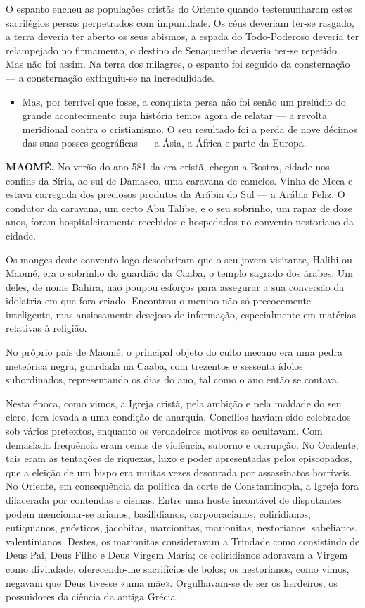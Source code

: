 \documentclass[11pt,a5paper,twoside,openany]{book}
\begin{document}
O espanto encheu as populações cristãs do Oriente quando testemunharam estes sacrilégios persas perpetrados com impunidade. Os céus deveriam ter-se rasgado, a terra deveria ter aberto os seus abismos, a espada do Todo-Poderoso deveria ter relampejado no firmamento, o destino de Senaqueribe deveria ter-se repetido. Mas não foi assim. Na terra dos milagres, o espanto foi seguido da consternação — a consternação extinguiu-se na incredulidade.

\begin{itemize}
\item Mas, por terrível que fosse, a conquista persa não foi senão um prelúdio do grande acontecimento cuja história temos agora de relatar — a revolta meridional contra o cristianismo. O seu resultado foi a perda de nove décimos das suas posses geográficas — a Ásia, a África e parte da Europa.
\end{itemize}
\textbf{MAOMÉ.} No verão do ano 581 da era cristã, chegou a Bostra, cidade nos confins da Síria, ao sul de Damasco, uma caravana de camelos. Vinha de Meca e estava carregada dos preciosos produtos da Arábia do Sul — a Arábia Feliz. O condutor da caravana, um certo Abu Talibe, e o seu sobrinho, um rapaz de doze anos, foram hospitaleiramente recebidos e hospedados no convento nestoriano da cidade.

Os monges deste convento logo descobriram que o seu jovem visitante, Halibi ou Maomé, era o sobrinho do guardião da Caaba, o templo sagrado dos árabes. Um deles, de nome Bahira, não poupou esforços para assegurar a sua conversão da idolatria em que fora criado. Encontrou o menino não só precocemente inteligente, mas ansiosamente desejoso de informação, especialmente em matérias relativas à religião.

No próprio país de Maomé, o principal objeto do culto mecano era uma pedra meteórica negra, guardada na Caaba, com trezentos e sessenta ídolos subordinados, representando os dias do ano, tal como o ano então se contava.

Nesta época, como vimos, a Igreja cristã, pela ambição e pela maldade do seu clero, fora levada a uma condição de anarquia. Concílios haviam sido celebrados sob vários pretextos, enquanto os verdadeiros motivos se ocultavam. Com demasiada frequência eram cenas de violência, suborno e corrupção. No Ocidente, tais eram as tentações de riquezas, luxo e poder apresentadas pelos episcopados, que a eleição de um bispo era muitas vezes desonrada por assassinatos horríveis. No Oriente, em consequência da política da corte de Constantinopla, a Igreja fora dilacerada por contendas e cismas. Entre uma hoste incontável de disputantes podem mencionar-se arianos, basilidianos, carpocracianos, coliridianos, eutiquianos, gnósticos, jacobitas, marcionitas, marionitas, nestorianos, sabelianos, valentinianos. Destes, os marionitas consideravam a Trindade como consistindo de Deus Pai, Deus Filho e Deus Virgem Maria; os coliridianos adoravam a Virgem como divindade, oferecendo-lhe sacrifícios de bolos; os nestorianos, como vimos, negavam que Deus tivesse «uma mãe». Orgulhavam-se de ser os herdeiros, os possuidores da ciência da antiga Grécia.
\end{document}
